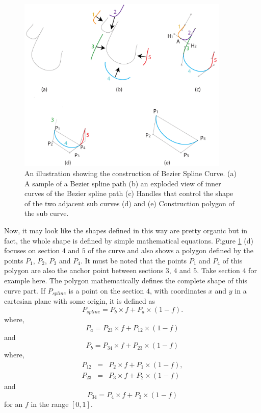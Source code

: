         \begin{figure}
          \centering
          \includegraphics[width=0.9\textwidth]{BezierSplineCurve.pdf}
          \caption{An illustration showing the construction of Bezier Spline Curve. (a) A sample of a Bezier spline path (b) an exploded view of inner curves of the Bezier spline path (c) Handles that control the shape of the two adjacent sub curves (d) and (e) Construction polygon of the sub curve.
          } \label{Fig:BezierSplines}
        \end{figure}

        Now, it may look like the shapes defined in this way are pretty organic but in fact, the whole shape is defined by simple mathematical equations. Figure \ref{Fig:BezierSplines} (d) focuses on section $4$ and $5$ of the curve and also shows a polygon defined by the points $P_1$, $P_2$, $P_3$ and  $P_4$. It must be noted that the points $P_1$ and $P_4$ of this polygon are also the anchor point between sections $3$, $4$ and $5$. Take section $4$ for example here. The polygon mathematically defines the complete shape of this curve part. If $P_{spline}$ is a point on the section $4$, with coordinates $x$ and $y$ in a cartesian plane with some origin, it is defined as
         \begin{equation}
         P_{spline}=P_b×f+P_a×(1 -f).
         \end{equation}
where,
\begin{equation}
P_a=P_{23}×f+P_{12}×(1 -f)
\end{equation}
and
\begin{equation}
P_b=P_{34}×f+P_{23}×(1 -f)
\end{equation}
where,
\begin{eqnarray}
P_{12}&=&P_2×f+P_1×(1 -f), \\
P_{23}&=&P_3×f+P_2×(1 -f)
\end{eqnarray}
and
\begin{equation}
P_{34}=P_4×f+P_3×(1 -f)
\end{equation}
for an $f$ in the range $[0, 1]$.

